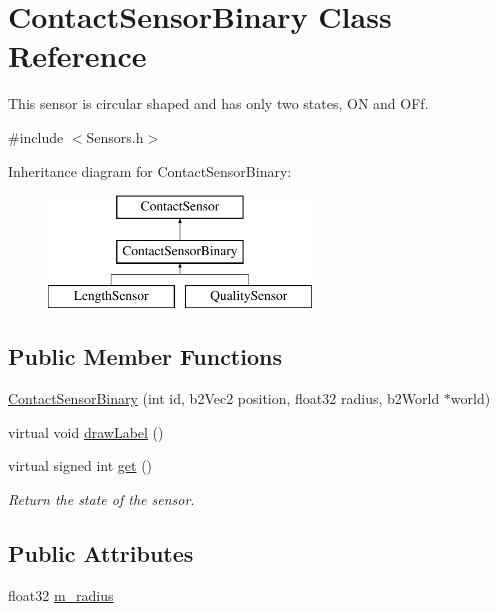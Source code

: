 \hypertarget{classContactSensorBinary}{\section{Contact\-Sensor\-Binary Class Reference}
\label{classContactSensorBinary}
}


This sensor is circular shaped and has only two states, O\-N and O\-Ff.  




{\ttfamily \#include $<$Sensors.\-h$>$}

Inheritance diagram for Contact\-Sensor\-Binary\-:\begin{figure}[H]
\begin{center}
\leavevmode
\includegraphics[height=3.000000cm]{classContactSensorBinary}
\end{center}
\end{figure}
\subsection*{Public Member Functions}
\begin{DoxyCompactItemize}
\item 
\hyperlink{classContactSensorBinary_acc94779d598ff1e435bc8726657c65af}{Contact\-Sensor\-Binary} (int id, b2\-Vec2 position, float32 radius, b2\-World $\ast$world)
\item 
virtual void \hyperlink{classContactSensorBinary_af6da2c72cf9ae64a27132bb9c6ba7ff3}{draw\-Label} ()
\item 
virtual signed int \hyperlink{classContactSensorBinary_a68e856e0d580f91f518099874f8c226b}{get} ()
\begin{DoxyCompactList}\small\item\em Return the state of the sensor. \end{DoxyCompactList}\end{DoxyCompactItemize}
\subsection*{Public Attributes}
\begin{DoxyCompactItemize}
\item 
float32 \hyperlink{classContactSensorBinary_a0670dd47fe23d52cc4d9dfccddb3bcab}{m\-\_\-radius}
\end{DoxyCompactItemize}


